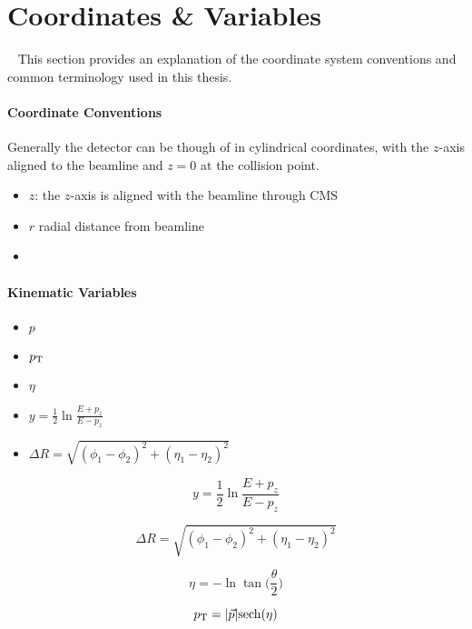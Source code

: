 \chapter{Coordinates \&  Variables}~\label{ch:variables}
This section provides an explanation of the coordinate system conventions and common terminology used in this thesis.

\subsubsection{Coordinate Conventions}
Generally the detector can be though of in cylindrical coordinates, with the $z$-axis aligned to the beamline and $z=0$ at the collision point.
\begin{itemize}
    \item $z$: the $z$-axis is aligned with the beamline through CMS
    \item $r$ radial distance from beamline
    \item 
\end{itemize}

\subsubsection{Kinematic Variables}
\begin{itemize}
    \item $p$
    \item $p_{\mathrm{T}}$
    \item $\eta$
    \item $y = \frac{1}{2}\ln\frac{E+p_z}{E-p_z}$
    \item $\Delta R = \sqrt{(\phi_1-\phi_2)^2 + (\eta_1-\eta_2)^2}$
    
\end{itemize}

$$ y = \frac{1}{2}\ln{\frac{E+p_z}{E-p_z}}  $$

$$\Delta R = \sqrt{(\phi_1-\phi_2)^2 + (\eta_1-\eta_2)^2} $$

$$ \eta = -\ln \tan\bigg(\frac{\theta}{2}\bigg) $$

$$p_{\mathrm{T}} = |\vec{p}| \mathrm{sech}(\eta)  $$